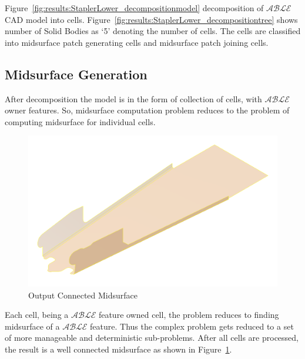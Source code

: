 
%

Figure~\ref{fig:results:StaplerLower_decompositionmodel}  decomposition of $\mathcal{ABLE}$ CAD model into cells. Figure~\ref{fig:results:StaplerLower_decompositiontree} shows number of Solid Bodies as `5' denoting the number of cells. The cells are classified into midsurface patch generating cells and midsurface patch joining cells.


\subsection{Midsurface Generation}

After decomposition the model is in the form of collection of cells, with $\mathcal{ABLE}$ owner features. So, midsurface computation problem reduces to the problem of computing midsurface for individual cells.


\begin{figure}[!h]
\centering     %
\includegraphics[width=0.62\linewidth,valign=t]{images/StaplerLower_midsurfcelljoin_model}
\caption{Output Connected Midsurface}
\label{fig:results:staplerlowermidsurfcelljoin}
\end{figure}


 Each cell, being a $\mathcal{ABLE}$ feature owned cell, the problem reduces to finding midsurface of a $\mathcal{ABLE}$ feature.  Thus the complex problem gets reduced to a set of more manageable and deterministic sub-problems. After all cells are processed, the result is a well connected midsurface as shown in Figure~\ref{fig:results:staplerlowermidsurfcelljoin}.

